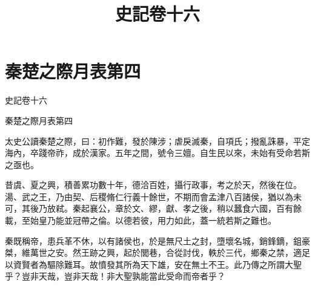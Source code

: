 \documentclass{ltc-book}
\begin{document}
\title{史記卷十六}
\chapter{秦楚之際月表第四}

\begin{正文}
史記卷十六

秦楚之際月表第四


太史公讀秦楚之際，曰：初作難，發於陳涉；虐戾滅秦，自項氏；撥亂誅暴，平定海內，卒踐帝祚，成於漢家。五年之間，號令三嬗。自生民以來，未始有受命若斯之亟也。

昔虞、夏之興，積善累功數十年，德洽百姓，攝行政事，考之於天，然後在位。湯、武之王，乃由契、后稷脩仁行義十餘世，不期而會孟津八百諸侯，猶以為未可，其後乃放弒。秦起襄公，章於文、繆，獻、孝之後，稍以蠶食六國，百有餘載，至始皇乃能並冠帶之倫。以德若彼，用力如此，蓋一統若斯之難也。

秦既稱帝，患兵革不休，以有諸侯也，於是無尺土之封，墮壞名城，銷鋒鏑，鉏豪桀，維萬世之安。然王跡之興，起於閭巷，合從討伐，軼於三代，鄉秦之禁，適足以資賢者為驅除難耳。故憤發其所為天下雄，安在無土不王。此乃傳之所謂大聖乎？豈非天哉，豈非天哉！非大聖孰能當此受命而帝者乎？


\end{正文}
\end{document}
